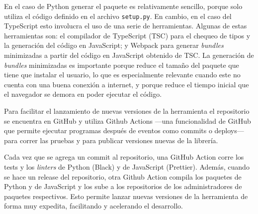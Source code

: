 En el caso de Python generar el paquete es relativamente sencillo, porque solo utiliza el código definido en el archivo \texttt{setup.py}. En cambio, en el caso del TypeScript esto involucra el uso de una serie de herramientas. Algunas de estas herramientas son: el compilador de TypeScript (TSC) para el chequeo de tipos y la generación del código en JavaScript; y Webpack para generar \textit{bundles} minimizadas a partir del código en JavaScript obtenido de TSC. La generación de \textit{bundles} minimizadas es importante porque reduce el tamaño del paquete que tiene que instalar el usuario, lo que es especialmente relevante cuando este no cuenta con una buena conexión a internet, y porque reduce el tiempo inicial que el navegador se demora en poder ejecutar el código.

Para facilitar el lanzamiento de nuevas versiones de la herramienta el repositorio se encuentra en GitHub y utiliza Github Actions ---una funcionalidad de GitHub que permite ejecutar programas después de eventos como commits o deploys--- para correr las pruebas y para publicar versiones nuevas de la librería.

Cada vez que se agrega un commit al repositorio, una GitHub Action corre los tests y los \textit{linters} de Python (Black) y de JavaScript (Prettier). Además, cuando se hace un release del repositorio, otra Github Action compila los paquetes de Python y de JavaScript y los sube a los repositorios de los administradores de paquetes respectivos. Esto permite lanzar nuevas versiones de la herramienta de forma muy expedita, facilitando y acelerando el desarrollo.
